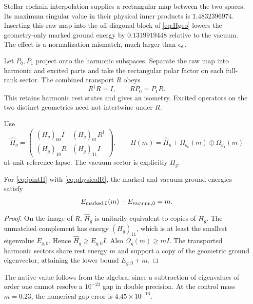 Stellar cochain interpolation supplies a rectangular map between the two spaces. Its maximum singular value in their physical inner products is $1.4832396974$. Inserting this raw map into the off-diagonal block of \eqref{eq:Hgeo} lowers the geometry-only marked ground energy by $0.1319919448$ relative to the vacuum. The effect is a normalization mismatch, much larger than $\epsilon_e$.

Let $P_0,P_1$ project onto the harmonic subspaces. Separate the raw map into harmonic and excited parts and take the rectangular polar factor on each full-rank sector. The combined transport $R$ obeys
\begin{equation}
R^\dagger R=I,\qquad RP_0=P_1R.
\label{eq:physicalR}
\end{equation}
This retains harmonic rest states and gives an isometry. Excited operators on the two distinct geometries need not intertwine under $R$.

Use
\begin{equation}
\widehat H_g=
\begin{pmatrix}
(H_g)_{00}I&(H_g)_{01}R^\dagger\\
(H_g)_{10}R&(H_g)_{11}I
\end{pmatrix},
\qquad
H(m)=\widehat H_g+\Omega_{g_0}(m)\oplus\Omega_{g_1}(m)
\label{eq:jointH}
\end{equation}
at unit reference lapse. The vacuum sector is explicitly $H_g$.

\begin{proposition}
For \eqref{eq:jointH} with \eqref{eq:physicalR}, the marked and vacuum ground energies satisfy
\begin{equation}
E_{\rm marked,0}(m)-E_{\rm vacuum,0}=m.
\end{equation}
\end{proposition}
\begin{proof}
On the image of $R$, $\widehat H_g$ is unitarily equivalent to copies of $H_g$. The unmatched complement has energy $(H_g)_{11}$, which is at least the smallest eigenvalue $E_{g,0}$. Hence $\widehat H_g\ge E_{g,0}I$. Also $\Omega_g(m)\ge mI$. The transported harmonic sectors share rest energy $m$ and support a copy of the geometric ground eigenvector, attaining the lower bound $E_{g,0}+m$.
\end{proof}

The native value follows from the algebra, since a subtraction of eigenvalues of order one cannot resolve a $10^{-23}$ gap in double precision. At the control mass $m=0.23$, the numerical gap error is $4.45\times10^{-16}$.

